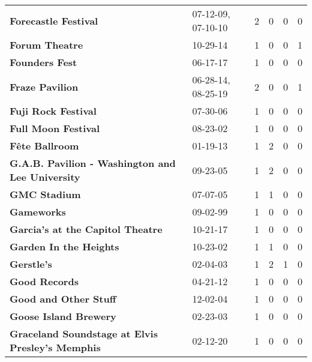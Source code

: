 \begin{supertabular}{p{0.4\textwidth}p{0.3\textwidth}p{0.05\textwidth}p{0.05\textwidth}p{0.05\textwidth}p{0.05\textwidth}}
                                         \textbf{Forecastle Festival} &  07-12-09, 07-10-10 &  2 &  0 &  0 &  0 \\
                                               \textbf{Forum Theatre} &            10-29-14 &  1 &  0 &  0 &  1 \\
                                               \textbf{Founders Fest} &            06-17-17 &  1 &  0 &  0 &  0 \\
                                              \textbf{Fraze Pavilion} &  06-28-14, 08-25-19 &  2 &  0 &  0 &  1 \\
                                          \textbf{Fuji Rock Festival} &            07-30-06 &  1 &  0 &  0 &  0 \\
                                          \textbf{Full Moon Festival} &            08-23-02 &  1 &  0 &  0 &  0 \\
                                               \textbf{Fête Ballroom} &            01-19-13 &  1 &  2 &  0 &  0 \\
             \textbf{G.A.B. Pavilion - Washington and Lee University} &            09-23-05 &  1 &  2 &  0 &  0 \\
                                                 \textbf{GMC Stadium} &            07-07-05 &  1 &  1 &  0 &  0 \\
                                                   \textbf{Gameworks} &            09-02-99 &  1 &  0 &  0 &  0 \\
                             \textbf{Garcia’s at the Capitol Theatre} &            10-21-17 &  1 &  0 &  0 &  0 \\
                                       \textbf{Garden In the Heights} &            10-23-02 &  1 &  1 &  0 &  0 \\
                                                   \textbf{Gerstle's} &            02-04-03 &  1 &  2 &  1 &  0 \\
                                                \textbf{Good Records} &            04-21-12 &  1 &  0 &  0 &  0 \\
                                        \textbf{Good and Other Stuff} &            12-02-04 &  1 &  0 &  0 &  0 \\
                                        \textbf{Goose Island Brewery} &            02-23-03 &  1 &  0 &  0 &  0 \\
             \textbf{Graceland Soundstage at Elvis Presley’s Memphis} &            02-12-20 &  1 &  0 &  0 &  0 \\

\end{supertabular}
